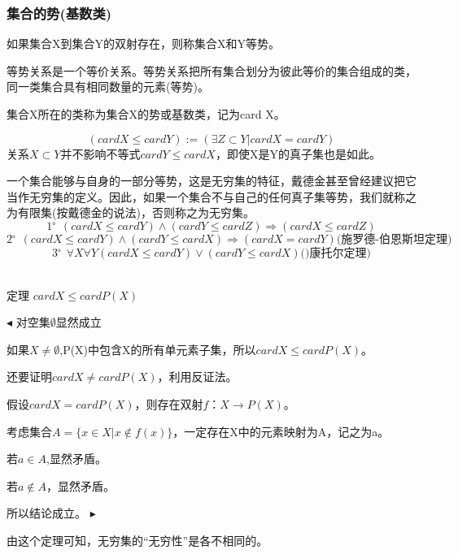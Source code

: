\documentclass{article}
\begin{document}
	\subsubsection{集合的势(基数类)}
	如果集合X到集合Y的双射存在，则称集合X和Y等势。
	\par 等势关系是一个等价关系。等势关系把所有集合划分为彼此等价的集合组成的类，同一类集合具有相同数量的元素(等势)。
	\par 集合X所在的类称为集合X的势或基数类，记为card X。
	~\\ \par 
	$$(card X\leq card Y):=(\exists Z\subset Y\rvert card X=card Y)$$
	\quad \quad 关系$X\subset Y$并不影响不等式$card Y\leq card X$，即使X是Y的真子集也是如此。
	~\\ \par 
	一个集合能够与自身的一部分等势，这是无穷集的特征，戴德金甚至曾经建议把它当作无穷集的定义。因此，如果一个集合不与自己的任何真子集等势，我们就称之为有限集(按戴德金的说法)，否则称之为无穷集。
	$$1^{\mbox{。}}(cardX\leq cardY)\wedge (cardY\leq cardZ)\Rightarrow (card X\leq cardZ)$$
	$$2^{\mbox{。}}(cardX\leq cardY)\wedge (cardY\leq cardX)\Rightarrow (card X=card Y)\mbox{(施罗德-伯恩斯坦定理)}$$
	$$3^{\mbox{。}}\forall X\forall Y(card X\leq card Y)\vee (cardY\leq cardX)\mbox{()康托尔定理)}$$
	~\\ \par 
	定理 $cardX\le cardP(X)$
	\par 
	$\blacktriangleleft$
	对空集$\emptyset$显然成立
	\par 如果$X\ne \emptyset$,P(X)中包含X的所有单元素子集，所以$cardX\leq cardP(X)$。
	\par 还要证明$cardX\ne cardP(X)$，利用反证法。
	\par 假设$cardX=cardP(X)$，则存在双射$f：X\rightarrow P(X)$。
	\par 考虑集合$A=\{x\in X\rvert x\notin f(x)\}$，一定存在X中的元素映射为A，记之为a。
	\par 若$a\in A$,显然矛盾。
	\par 若$a\notin A$，显然矛盾。
	\par 所以结论成立。
	 $\blacktriangleright$
	 \par 由这个定理可知，无穷集的“无穷性”是各不相同的。
\end{document}
